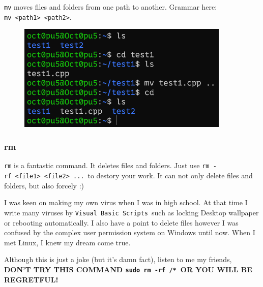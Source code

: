 \documentclass[12pt]{ctexart}
\newenvironment{mdquote}
{%
  \par\noindent
  \begin{list}{}{%
      \setlength{\leftmargin}{1em}%
      \setlength{\rightmargin}{0pt}%
      \setlength{\itemindent}{0pt}%
      \setlength{\listparindent}{\parindent}%
      \setlength{\topsep}{0.5\baselineskip}%
  }
  \item[\textbf{>}\ ]\itshape
}
{\end{list}\par}
\begin{document}
\texttt{mv} moves files and folders from one path to another. Grammar
here:
\texttt{mv\ \textless{}path1\textgreater{}\ \textless{}path2\textgreater{}}.

\begin{figure}[H]
    \centering
    \includegraphics[width=0.9\textwidth,keepaspectratio]{assets/Linux/1.5 Linux file commands/5.png}
\end{figure}

\subsubsection{\textbf{rm}}

\texttt{rm} is a fantastic command. It deletes files and folders. Just
use
\texttt{rm\ -rf\ \textless{}file1\textgreater{}\ \textless{}file2\textgreater{}\ ...}\
to destory your work. It can not only delete files and folders, but also
forcely :)

I was keen on making my own virus when I was in high school. At that
time I write many viruses by \texttt{Visual\ Basic\ Scripts}\ such as
locking Desktop wallpaper or rebooting automatically. I also have a
point to delete files however I was confused by the complex user
permission system on Windows until now. When I met Linux, I knew my
dream come true.

\begin{mdquote}
Although this is just a joke (but it's damn fact),
listen to me my friends, \textbf{DON'T TRY THIS COMMAND
\texttt{sudo\ rm\ -rf\ /*}\ OR YOU WILL BE REGRETFUL!}
\end{mdquote}
\end{document}
